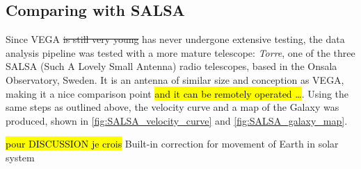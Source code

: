 \subsection{Comparing with SALSA}
Since VEGA \st{is still very young} has never undergone extensive testing, the data analysis pipeline was tested with a more mature telescope: \emph{Torre}, one of the three SALSA (Such A Lovely Small Antenna) radio telescopes, based in the Onsala Observatory, Sweden.
It is an antenna of similar size and conception as VEGA, making it a nice comparison point \hl{and it can be remotely operated \ldots}. Using the same steps as outlined above, the velocity curve and a map of the Galaxy was produced, shown in \autoref{fig:SALSA_velocity_curve} and \autoref{fig:SALSA_galaxy_map}.

\hl{pour DISCUSSION je crois} Built-in correction for movement of Earth in solar system

